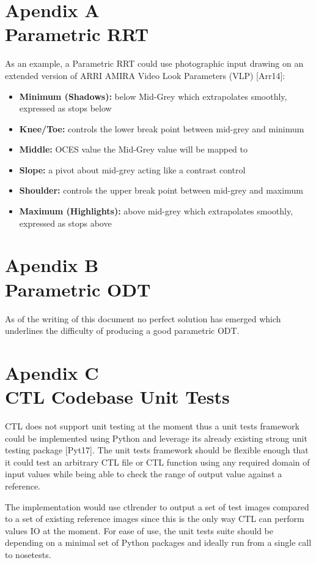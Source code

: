 \documentclass[conference]{IEEEtran}
\begin{document}
\section*{Apendix A\\ \small Parametric RRT}
As an example, a Parametric RRT could use photographic input drawing on an extended version of ARRI AMIRA Video Look Parameters (VLP) [Arr14]:

\begin{itemize}
\item \textbf{Minimum (Shadows):} below Mid-Grey which extrapolates smoothly, expressed as stops below
\item \textbf{Knee/Toe:} controls the lower break point between mid-grey and minimum
\item \textbf{Middle:} OCES value the Mid-Grey value will be mapped to
\item \textbf{Slope:} a pivot about mid-grey acting like a contrast control
\item \textbf{Shoulder:} controls the upper break point between mid-grey and maximum
\item \textbf{Maximum (Highlights):} above mid-grey which extrapolates smoothly, expressed as stops above
\end{itemize}

\section*{Apendix B\\ \small Parametric ODT}
As of the writing of this document no perfect solution has emerged which underlines the difficulty of producing a good parametric ODT.

\section*{Apendix C\\ \small CTL Codebase Unit Tests}
CTL does not support unit testing at the moment thus a unit tests framework could be implemented using Python and leverage its already existing strong unit testing package [Pyt17]. The unit tests framework should be flexible enough that it could test an arbitrary CTL file or CTL function using any required domain of input values while being able to check the range of output value against a reference.

The implementation would use ctlrender to output a set of test images compared to a set of existing reference images since this is the only way CTL can perform values IO at the moment. For ease of use, the unit tests suite should be depending on a minimal set of Python packages and ideally run from a single call to nosetests.
\end{document}
